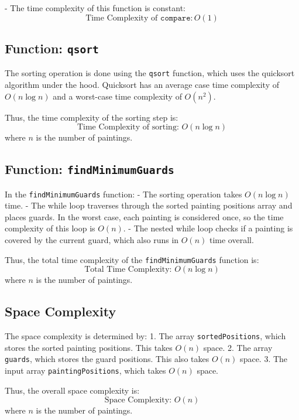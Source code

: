 \documentclass[a4paper,12pt]{report}
\begin{document}
- The time complexity of this function is constant:
\[
\text{Time Complexity of } \texttt{compare}: O(1)
\]

\subsection*{Function: \texttt{qsort}}

The sorting operation is done using the \texttt{qsort} function, which uses the quicksort algorithm under the hood. Quicksort has an average case time complexity of \(O(n \log n)\) and a worst-case time complexity of \(O(n^2)\).

Thus, the time complexity of the sorting step is:
\[
\text{Time Complexity of sorting: } O(n \log n)
\]
where \(n\) is the number of paintings.

\subsection*{Function: \texttt{findMinimumGuards}}

In the \texttt{findMinimumGuards} function:
- The sorting operation takes \(O(n \log n)\) time.
- The while loop traverses through the sorted painting positions array and places guards. In the worst case, each painting is considered once, so the time complexity of this loop is \(O(n)\).
- The nested while loop checks if a painting is covered by the current guard, which also runs in \(O(n)\) time overall.

Thus, the total time complexity of the \texttt{findMinimumGuards} function is:
\[
\text{Total Time Complexity: } O(n \log n)
\]
where \(n\) is the number of paintings.

\subsection*{Space Complexity}

The space complexity is determined by:
1. The array \texttt{sortedPositions}, which stores the sorted painting positions. This takes \(O(n)\) space.
2. The array \texttt{guards}, which stores the guard positions. This also takes \(O(n)\) space.
3. The input array \texttt{paintingPositions}, which takes \(O(n)\) space.

Thus, the overall space complexity is:
\[
\text{Space Complexity: } O(n)
\]
where \(n\) is the number of paintings.
\end{document}
